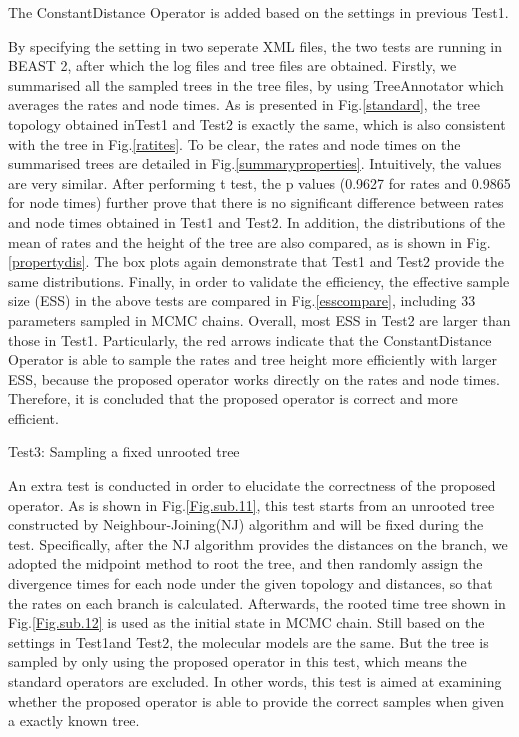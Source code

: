 \documentclass{bmcart}
\begin{document}
The ConstantDistance Operator is added based on the settings in previous Test1. 

By specifying the setting in two seperate XML files, the two tests are running in BEAST 2, after which the log files and tree files are obtained. Firstly, we summarised all the sampled trees in the tree files, by using TreeAnnotator which averages the rates and node times. As is presented in Fig.\ref{standard}, the tree topology obtained inTest1 and Test2 is exactly the same, which is also consistent with the tree in Fig.\ref{ratites}. To be clear, the rates and node times on the summarised trees are detailed in Fig.\ref{summaryproperties}. Intuitively, the values are very similar. After performing t test, the p values (0.9627 for rates and 0.9865 for node times) further prove that there is no significant difference between rates and node times obtained in Test1 and Test2. In addition, the distributions of the mean of rates and the height of the tree are also compared, as is shown in Fig.\ref{propertydis}. The box plots again demonstrate that Test1 and Test2 provide the same distributions. Finally, in order to validate the efficiency, the effective sample size (ESS) in the above tests are compared in Fig.\ref{esscompare}, including 33 parameters sampled in MCMC chains. Overall, most ESS in Test2 are larger than those in Test1. Particularly, the red arrows indicate that the ConstantDistance Operator is able to sample the rates and tree height more efficiently with larger ESS, because the proposed operator works directly on the rates and node times. Therefore, it is concluded that the proposed operator is correct and more efficient.

\begin{description}
\item[Test3: Sampling a fixed unrooted tree] 
\end{description}
An extra test is conducted in order to elucidate the correctness of the proposed operator. As is shown in Fig.\ref{Fig.sub.11}, this test starts from an unrooted tree constructed by Neighbour-Joining(NJ) algorithm and will be fixed during the test. Specifically, after the NJ algorithm provides the distances on the branch, we adopted the midpoint method to root the tree, and then randomly assign the divergence times for each node under the given topology and distances, so that the rates on each branch is calculated. Afterwards, the rooted time tree shown in Fig.\ref{Fig.sub.12}  is used as the initial state in MCMC chain. Still based on the settings in Test1and Test2, the molecular models are the same. But the tree is sampled by only using the proposed operator in this test, which means the standard operators are excluded. In other words, this test is aimed at examining whether the proposed operator is able to provide the correct samples when given a exactly known tree.
\end{document}
